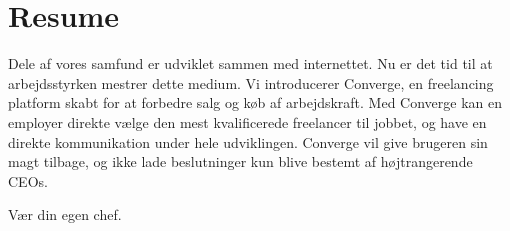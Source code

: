 \chapter{Resume}

Dele af vores samfund er udviklet sammen med internettet. Nu er det tid til at arbejdsstyrken mestrer dette medium. Vi introducerer Converge, en freelancing platform skabt for at forbedre salg og køb af arbejdskraft. Med Converge kan en employer direkte vælge den mest kvalificerede freelancer til jobbet, og have en direkte kommunikation under hele udviklingen. Converge vil give brugeren sin magt tilbage, og ikke lade beslutninger kun blive bestemt af højtrangerende CEOs.

Vær din egen chef.
